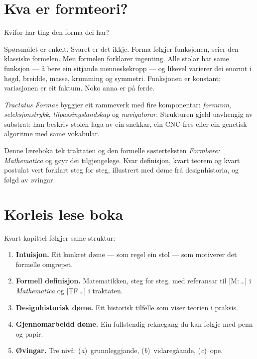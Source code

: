 \documentclass[10pt]{book}
\theoremstyle{definition}
\theoremstyle{plain}
\theoremstyle{remark}
\newcommand{\TF}[1]{\textnormal{[TF\,#1]}}
\newcommand{\Mref}[1]{\textnormal{[M:\,#1]}}
\begin{document}
\section*{Kva er formteori?}

Kvifor har ting den forma dei har?

Sp\o rsm\aa let er enkelt. Svaret er det ikkje. Forma f\o lgjer funksjonen, seier den klassiske formelen. Men formelen forklarer ingenting. Alle stolar har same funksjon --- \aa{} bere ein sitjande menneskekropp --- og likevel varierer dei enormt i h\o gd, breidde, masse, krumming og symmetri. Funksjonen er konstant; variasjonen er eit faktum. Noko anna er p\aa{} ferde.

\textit{Tractatus Formae} byggjer eit rammeverk med fire komponentar: \textit{formrom}, \textit{seleksjonstrykk}, \textit{tilpassingslandskap} og \textit{navigatorar}. Strukturen gjeld uavhengig av substrat: han beskriv stolen laga av ein snekkar, ein CNC-fres eller ein genetisk algoritme med same vokabular.

Denne l\ae reboka tek traktaten og den formelle s\o sterteksten \textit{Forml\ae re: Mathematica} og g\o yr dei til\-gjengelege. Kvar definisjon, kvart teorem og kvart postulat vert forklart steg for steg, illustrert med d\o me fr\aa{} designhistoria, og f\o lgd av \o vingar.

\section*{Korleis lese boka}

Kvart kapittel f\o lgjer same struktur:

\begin{enumerate}
  \item \textbf{Intuisjon.} Eit konkret d\o me --- som regel ein stol --- som motiverer det formelle omgrepet.
  \item \textbf{Formell definisjon.} Matematikken, steg for steg, med referansar til \Mref{\ldots} i \textit{Mathematica} og \TF{\ldots} i traktaten.
  \item \textbf{Designhistorisk d\o me.} Eit historisk tilfelle som viser teorien i praksis.
  \item \textbf{Gjennomarbeidd d\o me.} Ein fullstendig reknegang du kan f\o lgje med penn og papir.
  \item \textbf{\O vingar.} Tre niv\aa: (\emph{a})~grunnleggjande, (\emph{b})~vidareg\aa ande, (\emph{c})~ope.
\end{enumerate}
\end{document}
